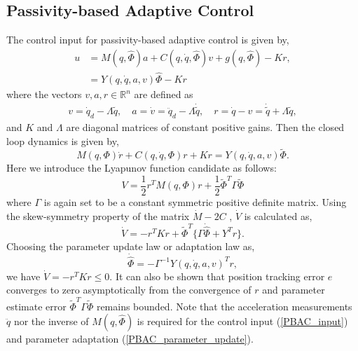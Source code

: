 \documentclass[letterpaper, 10 pt, conference]{ieeeconf}  %
\begin{document}
\subsection{Passivity-based Adaptive Control \cite{Slotine_AdaptiveControl}}
The control input for passivity-based adaptive control is given by,
\begin{align}
u & = M(q,\hat{\Phi})a + C(q,\dot{q},\hat{\Phi})v + g(q,\hat{\Phi})-Kr, \label{PBAC_input}\\
& = Y(q,\dot{q}, a, v)\hat{\Phi} - Kr \nonumber
\end{align}
where the vectors $v,a,r\in\mathbb{R}^{n}$ are defined as
\begin{align*}
v = \dot{q}_{d}-\Lambda\tilde{q}, \quad
a = \dot{v} = \ddot{q}_{d}-\Lambda\dot{\tilde{q}}, \quad
r = \dot{q}-v = \dot{\tilde{q}}+\Lambda\tilde{q},
\end{align*}
and $K$ and $\Lambda$ are diagonal matrices of constant positive gains. Then the closed loop dynamics is given by,
\begin{equation*}
M(q,\Phi)\dot{r} + C(q,\dot{q},\Phi)r+Kr = Y(q,\dot{q},a,v)\tilde{\Phi}.
\end{equation*}
Here we introduce the Lyapunov function candidate as follows:
\begin{equation}
V = \frac{1}{2}r^{T}M(q,\Phi)r +\frac{1}{2}\tilde{\Phi}^{T}\Gamma\tilde{\Phi} \label{Slotine_lyapunov}
\end{equation}
where $\Gamma$ is again set to be a constant symmetric positive definite matrix.
Using the skew-symmetry property of the matrix $\dot{M} - 2C$ \cite{Slotine_AdaptiveControl}, $\dot{V}$ is calculated as,
\begin{equation*}
\dot{V} = -r^{T}Kr + \tilde{\Phi}^{T}\{\Gamma\dot{\hat{\Phi}} + Y^{T}r\}.
\end{equation*}
Choosing the parameter update law or adaptation law as,
\begin{equation}
\dot{\hat{\Phi}} = -\Gamma^{-1}Y(q,\dot{q},a,v)^{T}r, \label{PBAC_parameter_update}
\end{equation}
we have $\dot{V} = -r^{T}Kr \leq 0$.
It can also be shown that position tracking error $e$ converges to zero asymptotically from the convergence of $r$ and parameter estimate error $\tilde{\Phi}^T\Gamma\tilde{\Phi}$ remains bounded. Note that the acceleration measurements $\ddot{q}$ nor the inverse of $M(q,\hat{\Phi})$ is required for the control input (\ref{PBAC_input}) and parameter adaptation (\ref{PBAC_parameter_update}).
\end{document}
